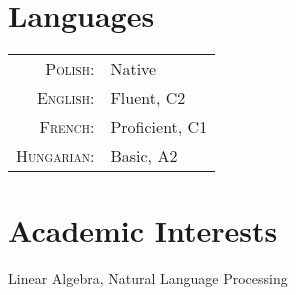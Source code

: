 \documentclass[a4paper,10pt]{article}
\begin{document}
\section{Languages}
\begin{tabular}{rl}
    \textsc{Polish:}    & Native\\
    \textsc{English:}   & Fluent, \textsc{C2}\\
    \textsc{French:}    & Proficient, \textsc{C1}\\
    \textsc{Hungarian:} & Basic, \textsc{A2}
\end{tabular}

\section{Academic Interests}
Linear Algebra, Natural Language Processing


\end{document}
